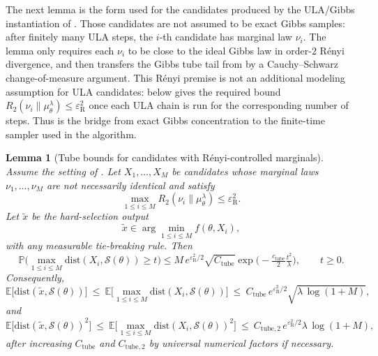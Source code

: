 \documentclass{article}
\theoremstyle{normaltheorem}
\newtheorem{lemma}[lemma]{Lemma}
\newcommand{\gibbs}{\mu}
\newcommand{\calS}{\mathcal{S}}
\begin{document}
The next lemma is the form used for the candidates produced by the ULA/Gibbs instantiation of
. Those candidates are not assumed to be exact Gibbs samples: after finitely many ULA steps, the
\(i\)-th candidate has marginal law \(\nu_i\). The
lemma only requires each \(\nu_i\) to be close to the ideal Gibbs law in order-\(2\) R\'enyi divergence, and then transfers
the Gibbs tube tail from  by a Cauchy--Schwarz change-of-measure argument. This R\'enyi premise
is not an additional modeling assumption for ULA candidates:  below gives the required bound
\(R_2(\nu_i\|\gibbs_\theta^\lambda)\le \varepsilon_{\mathrm R}^2\) once each ULA chain is run for the corresponding number
of steps. Thus  is the bridge from exact Gibbs concentration to the finite-time sampler used in the
algorithm.

\begin{lemma}[Tube bounds for candidates with R\'enyi-controlled marginals]\label{lem:tube-width}
Assume the setting of . Let $X_1,\dots,X_M$ be candidates whose marginal laws
$\nu_1,\dots,\nu_M$ are not necessarily identical and satisfy
\[
\max_{1\le i\le M}R_2(\nu_i\|\gibbs_\theta^\lambda)\le \varepsilon_{\mathrm{R}}^2.
\]
Let $\tilde x$ be the hard-selection output
\[
\tilde x\in\arg\min_{1\le i\le M} f(\theta,X_i),
\]
with any measurable tie-breaking rule. Then
\begin{equation}\label{eq:nu-tail-max}
\mathbb P\!\Big(\max_{1\le i\le M}\mathrm{dist}(X_i,\calS(\theta))\ge t\Big)
\le
M\,e^{\varepsilon_{\mathrm{R}}^2/2}\sqrt{C_{\mathrm{tube}}}
\exp\!\Big(-\tfrac{c_{\mathrm{tube}}}{2}\tfrac{t^2}{\lambda}\Big),
\qquad t\ge0.
\end{equation}
Consequently,
\begin{equation}\label{eq:dist-tilde-max-lmc}
\mathbb E\big[\mathrm{dist}(\tilde x,\calS(\theta))\big]
\ \le\
\mathbb E\Big[\max_{1\le i\le M}\mathrm{dist}(X_i,\calS(\theta))\Big]
\ \le\
C_{\mathrm{tube}}\,e^{\varepsilon_{\mathrm{R}}^2/2}\sqrt{\lambda\,\log(1+M)},
\end{equation}
and
\begin{equation}\label{eq:dist-tilde-max2-lmc}
\mathbb E\big[\mathrm{dist}(\tilde x,\calS(\theta))^2\big]
\ \le\
\mathbb E\Big[\max_{1\le i\le M}\mathrm{dist}(X_i,\calS(\theta))^2\Big]
\ \le\
C_{\mathrm{tube},2}\,e^{\varepsilon_{\mathrm{R}}^2/2}\lambda\,\log(1+M),
\end{equation}
after increasing \(C_{\mathrm{tube}}\) and \(C_{\mathrm{tube},2}\) by universal numerical factors if necessary.
\end{lemma}
\end{document}
